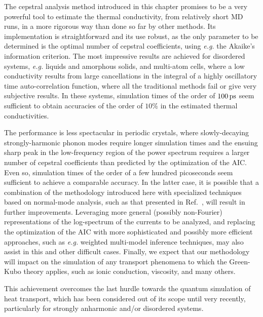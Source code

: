 \begin{LEtext}
The cepstral analysis method introduced in this chapter promises to be a very powerful tool to estimate the thermal conductivity, from relatively short MD runs, in a more rigorous way than done so far by other methods. 
Its implementation is straightforward and its use robust, as the only parameter to be determined is the optimal number of cepstral coefficients, using \emph{e.g.} the Akaike's information criterion.
The most impressive results are achieved for disordered systems, \emph{e.g.} liquids and amorphous solids, and multi-atom cells, where a low conductivity results from large cancellations in the integral of a highly oscillatory time auto-correlation function, where all the traditional methods fail or give very subjective results. In these systems, simulation times of the order of $100\,\mathrm{ps}$ seem sufficient to obtain accuracies of the order of $10\%$ in the estimated thermal conductivities. 

The performance is less spectacular in periodic crystals, where slowly-decaying strongly-harmonic phonon modes require longer simulation times and the ensuing sharp peak in the low-frequency region of the power spectrum requires a larger number of cepstral coefficients than predicted by the optimization of the AIC. Even so, simulation times of the order of a few hundred picoseconds seem sufficient to achieve a comparable accuracy. In the latter case, it is possible that a combination of the methodology introduced here with specialized techniques based on normal-mode analysis, such as that presented in Ref.~\cite{Carbogno:2017gc}, will result in further improvements. 
Leveraging more general (possibly non-Fourier) representations of the log-spectrum of the currents to be analyzed, and replacing the optimization of the AIC with more sophisticated and possibly more efficient approaches, such as \emph{e.g.} weighted multi-model inference techniques,\cite{Burnham2004,Claeskens2008} may also assist in this and other difficult cases. 
Finally, we expect that our methodology will impact on the simulation of any transport phenomena to which the Green-Kubo theory applies, such as ionic conduction, viscosity, and many others.

This achievement overcomes the last hurdle towards the quantum simulation of heat transport, which has been considered out of its scope until very recently, particularly for strongly anharmonic and/or disordered systems.

\end{LEtext}
